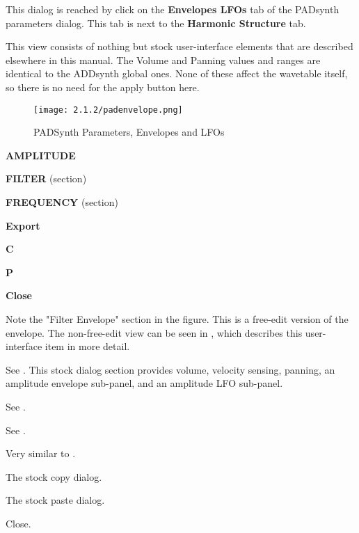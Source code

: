    This dialog is reached by click on the \textbf{Envelopes LFOs}
   tab of the PADsynth parameters dialog.  This tab is next to the
   \textbf{Harmonic Structure} tab.

   This view consists of nothing but stock user-interface elements that are
   described elsewhere in this manual.
   The Volume and Panning values and ranges are identical to the ADDsynth
   global ones.
   None of these affect the wavetable itself, so there is no need for the apply
   button here.

\begin{figure}[H]
   \centering
   \texttt{[image: 2.1.2/padenvelope.png]}
   \caption{PADSynth Parameters, Envelopes and LFOs}
   \label{fig:padsynth_parameters_envelopes_and_lfos}
\end{figure}

   \begin{enumber}
      \item \textbf{AMPLITUDE}
      \item \textbf{FILTER} (section)
      \item \textbf{FREQUENCY} (section)
      \item \textbf{Export}
      \item \textbf{C}
      \item \textbf{P}
      \item \textbf{Close}
   \end{enumber}

   Note the "Filter Envelope" section in the figure.  This is a free-edit
   version of the envelope.  The non-free-edit view can be seen in
   , which describes this user-interface item in more
   detail.

   See .
   This stock dialog section provides volume, velocity sensing, panning, an
   amplitude envelope sub-panel, and an amplitude LFO sub-panel.

   See .

   See .

   Very similar to
   .

   The stock copy dialog.

   The stock paste dialog.

   Close.

